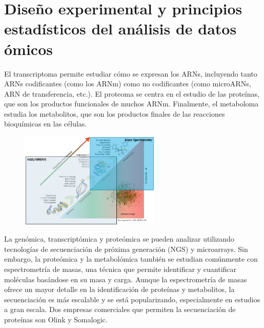 \chapter{Diseño experimental y principios estadísticos del análisis de datos ómicos}
El transcriptoma permite estudiar cómo se expresan los ARNs, incluyendo tanto ARNs codificantes (como los ARNm) como no codificantes (como microARNs, ARN de transferencia, etc.). El proteoma se centra en el estudio de las proteínas, que son los productos funcionales de muchos ARNm. Finalmente, el metaboloma estudia los metabolitos, que son los productos finales de las reacciones bioquímicas en las células.

\begin{figure}[h]
\centering
\includegraphics[width = 0.6\textwidth]{figs/omics.png}
\end{figure}

La genómica, transcriptómica y proteómica se pueden analizar utilizando tecnologías de secuenciación de próxima generación (NGS) y microarrays. Sin embargo, la proteómica y la metabolómica también se estudian comúnmente con espectrometría de masas, una técnica que permite identificar y cuantificar moléculas basándose en su masa y carga. Aunque la espectrometría de masas ofrece un mayor detalle en la identificación de proteínas y metabolitos, la secuenciación es más escalable y se está popularizando, especialmente en estudios a gran escala. Dos empresas comerciales que permiten la secuenciación de proteínas son Olink y Somalogic.

